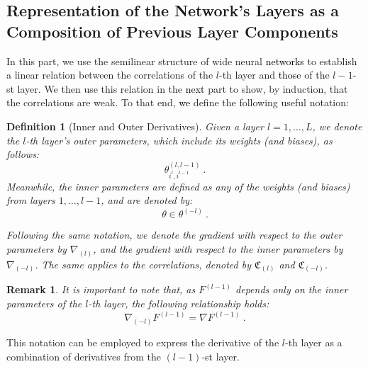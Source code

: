 \documentclass{article} %
\newtheorem{definition}{Definition}[section]
\newtheorem{remark}{Remark}
[section]
\begin{document}
\subsection{Representation of the Network's Layers as a Composition of Previous Layer Components}

In this part, we use the semilinear structure of wide neural \textcolor{black}{networks} to establish a linear relation between the correlations of the \(l\)-th layer and \textcolor{black}{those} of the \(l-1\)-st layer. We then use this relation in the \textcolor{black}{next} part to show, by induction, that the correlations are weak. To that end, \textcolor{black}{we} define the following useful notation:

\begin{definition}[Inner and Outer Derivatives]
\label{zap:der:InAndOurDer}
\textup
{Given a layer \(l=1,\ldots,L\), we denote the \(l\)-th layer's outer parameters, which include its weights (and biases), as follows:
\begin{equation}
\theta_{i^{l},i^{l-1}}^{\left(l,l-1\right)} \ .
\end{equation}
Meanwhile, the inner parameters are defined as any of the weights (and biases) from layers \(1,\ldots,l-1\), and are denoted by:
\begin{equation}
\theta\in\theta^{(-l)} \ .
\end{equation}
}

\textup
{Following the same notation, we denote the gradient with respect to the outer parameters by \(\nabla_{(l)}\), and the gradient with respect to the inner parameters by \(\nabla_{(-l)}\). The same applies to the correlations, denoted by \(\mathfrak{C}_{\left(l\right)}\) and \(\mathfrak{C}_{\left(-l\right)}\).
}
\end{definition}

\begin{remark}
\textup
{It is important to note that, as \(F^{(l-1)}\) depends only \textcolor{black}{on} the inner parameters of the \(l\)-th layer, the following relationship holds:
\begin{equation}
\nabla_{\left(-l\right)}F^{(l-1)}=\nabla F^{(l-1)} \ .
\end{equation}
}
\end{remark}

This notation can be employed to express the derivative of the \(l\)-th layer as a combination of derivatives from the \((l-1)\)-st layer.
\end{document}
